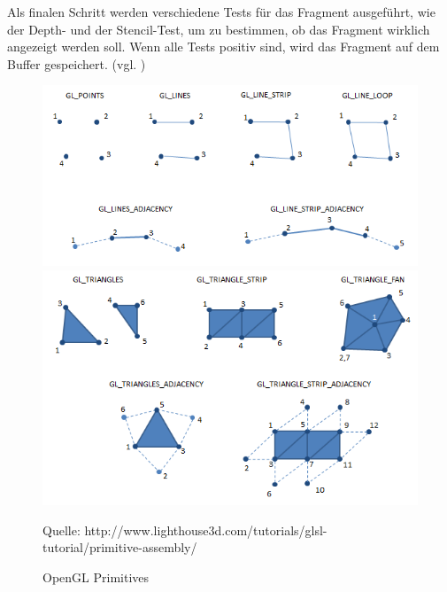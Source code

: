 Als finalen Schritt werden verschiedene Tests für das Fragment ausgeführt, wie der Depth- und der Stencil-Test, um zu bestimmen, ob das Fragment wirklich angezeigt werden soll. Wenn alle Tests positiv sind, wird das Fragment auf dem Buffer gespeichert. (vgl. \cite{Pipeline})
\begin{figure}
	\centering
	\includegraphics[scale=0.7]{02theorie/openglPrimitives.png}
	\includegraphics[scale=0.7]{02theorie/openglPrimitives2.png}
	
	
	Quelle: http://www.lighthouse3d.com/tutorials/glsl-tutorial/primitive-assembly/
	\caption{OpenGL Primitives}\label{OpenGLPrimitives}
\end{figure}


